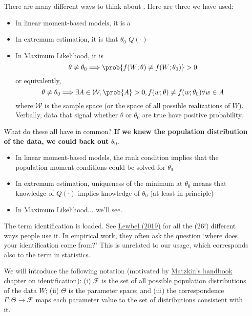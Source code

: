 \documentclass[10pt]{article}
\begin{document}
\begin{definition}
	There are many different ways to think about . Here are three we have used:
	\begin{itemize}
		\item In linear moment-based models, it is a 
		\item In extremum estimation, it is that $\theta_0$  $Q(\cdot)$
		\item In Maximum Likelihood, it is \[\theta \ne \theta_0 \Longrightarrow \prob\{f(W;\theta) \ne f(W;\theta_0)\}>0\]or equivalently,\[\theta \ne \theta_0 \Longrightarrow \exists A \in \mathcal{W},\prob\{A\} > 0,f(w;\theta) \ne f(w;\theta_0) \forall w\in A\]where $\mathcal{W}$ is the sample space (or the space of all possible realizations of $W$). Verbally, data that signal whether $\theta$ or $\theta_0$ are true have positive probability.
	\end{itemize}
	
	\begin{question}
		What do these all have in common? \textbf{If we knew the population distribution of the data, we could back out $\theta_0$}.
	\end{question}
	\begin{itemize}
		\item In linear moment-based models, the rank condition implies that the population moment conditions could be solved for $\theta_0$
		\item In extremum estimation, uniqueness of the minimum at $\theta_0$ means that knowledge of $Q(\cdot)$ implies knowledge of $\theta_0$ (at least in principle)
		\item In Maximum Likelihood... we'll see.
	\end{itemize}
	\begin{remark}
		The term identification is loaded. See \href{https://www.aeaweb.org/articles?id=10.1257/jel.20181361}{Lewbel (2019)} for all the (26!) different ways people use it. In empirical work, they often ask the question `where does your identification come from?' This is unrelated to our usage, which corresponds also to the term  in statistics.
	\end{remark}
\end{definition}

\begin{definition}
	We will introduce the following notation (motivated by \href{http://www.econ.ucla.edu/rmatzkin/research/handbook.pdf}{Matzkin's handbook} chapter on identification): (i) $\mathcal{F}$ is the set of all possible population distributions of the data $W$; (ii) $\Theta$ is the parameter space; and (iii) the correspondence $\Gamma: \Theta \to \mathcal{F}$ maps each parameter value to the set of distributions consistent with it.
\end{definition}
\end{document}
